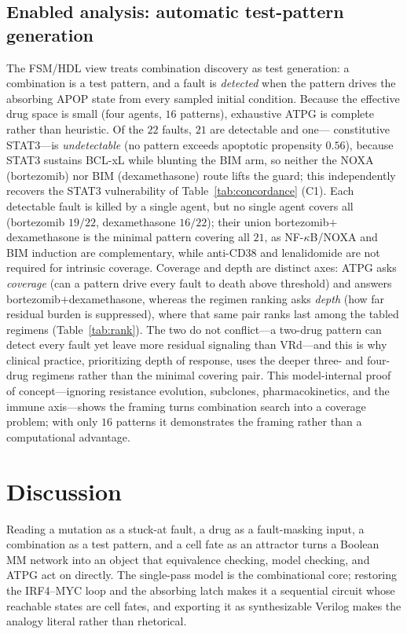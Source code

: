 \documentclass[conference,letterpaper]{IEEEtran}
\begin{document}
\subsection{Enabled analysis: automatic test-pattern generation}\label{sec:res-atpg}
The FSM/HDL view treats combination discovery as test generation: a combination
is a test pattern, and a fault is \emph{detected} when the pattern drives the
absorbing APOP state from every sampled initial condition. Because the effective
drug space is small (four agents, $16$ patterns), exhaustive ATPG is complete
rather than heuristic. Of the $22$ faults, $21$ are detectable and one---%
constitutive STAT3---is \emph{undetectable} (no pattern exceeds apoptotic
propensity $0.56$), because STAT3 sustains BCL-xL while blunting the BIM arm, so
neither the NOXA (bortezomib) nor BIM (dexamethasone) route lifts the guard; this
independently recovers the STAT3 vulnerability of Table~\ref{tab:concordance}
(C1). Each detectable fault is killed by a single agent, but no single agent
covers all (bortezomib $19/22$, dexamethasone $16/22$); their union
bortezomib$+$dexamethasone is the minimal pattern covering all $21$, as
NF-$\kappa$B/NOXA and BIM induction are complementary, while anti-CD38 and
lenalidomide are not required for intrinsic coverage. Coverage and depth are
distinct axes: ATPG asks \emph{coverage} (can a pattern drive every fault to death
above threshold) and answers bortezomib$+$dexamethasone, whereas the regimen
ranking asks \emph{depth} (how far residual burden is suppressed), where that same
pair ranks last among the tabled regimens (Table~\ref{tab:rank}). The two do not
conflict---a two-drug pattern can detect every fault yet leave more residual
signaling than VRd---and this is why clinical practice, prioritizing depth of
response, uses the deeper three- and four-drug regimens rather than the minimal
covering pair. This model-internal proof of
concept---ignoring resistance evolution, subclones, pharmacokinetics, and the
immune axis---shows the framing turns combination search into a coverage problem;
with only $16$ patterns it demonstrates the framing rather than a computational
advantage.

\section{Discussion}\label{sec:disc}
Reading a mutation as a stuck-at fault, a drug as a fault-masking input, a
combination as a test pattern, and a cell fate as an attractor turns a Boolean MM
network into an object that equivalence checking, model checking, and ATPG act on
directly. The single-pass model is the combinational core; restoring the
IRF4--MYC loop and the absorbing latch makes it a sequential circuit whose
reachable states are cell fates, and exporting it as synthesizable Verilog makes
the analogy literal rather than rhetorical.
\end{document}

